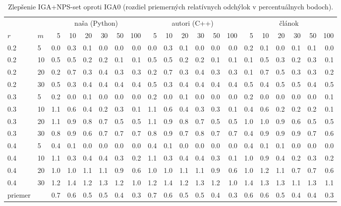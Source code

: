 \begin{table}[ht]
\centering
\scriptsize
\setlength{\tabcolsep}{3pt}
\caption{Zlepšenie IGA+NPS-set oproti IGA0 (rozdiel priemerných relatívnych odchýlok v percentuálnych bodoch).}
\label{tab:improvement_nps}
\begin{tabular}{ll|rrrrrr|rrrrrr|rrrrrr}
\toprule
 &  & \multicolumn{6}{c}{naša (Python)} & \multicolumn{6}{c}{autori (C++)} & \multicolumn{6}{c}{článok} \\
$r$ & $m$ & 5 & 10 & 20 & 30 & 50 & 100 & 5 & 10 & 20 & 30 & 50 & 100 & 5 & 10 & 20 & 30 & 50 & 100 \\
\midrule
0.2 & 5 & 0.0 & 0.3 & 0.1 & 0.0 & 0.0 & 0.0 & 0.0 & 0.3 & 0.1 & 0.0 & 0.0 & 0.0 & 0.2 & 0.1 & 0.0 & 0.1 & 0.1 & 0.0 \\
0.2 & 10 & 0.5 & 0.5 & 0.2 & 0.2 & 0.1 & 0.1 & 0.5 & 0.5 & 0.2 & 0.2 & 0.1 & 0.1 & 0.1 & 0.5 & 0.3 & 0.2 & 0.3 & 0.1 \\
0.2 & 20 & 0.2 & 0.7 & 0.3 & 0.4 & 0.3 & 0.3 & 0.2 & 0.7 & 0.3 & 0.4 & 0.3 & 0.3 & 0.1 & 0.7 & 0.5 & 0.3 & 0.3 & 0.2 \\
0.2 & 30 & 0.5 & 0.3 & 0.4 & 0.4 & 0.4 & 0.4 & 0.5 & 0.3 & 0.4 & 0.4 & 0.4 & 0.4 & 0.5 & 0.4 & 0.5 & 0.5 & 0.4 & 0.5 \\
0.3 & 5 & 0.2 & 0.0 & 0.1 & 0.0 & 0.0 & 0.0 & 0.2 & 0.0 & 0.1 & 0.0 & 0.0 & 0.0 & 0.2 & 0.0 & 0.0 & 0.0 & 0.0 & 0.1 \\
0.3 & 10 & 1.1 & 0.6 & 0.4 & 0.2 & 0.3 & 0.1 & 1.1 & 0.6 & 0.4 & 0.3 & 0.3 & 0.1 & 0.4 & 0.6 & 0.2 & 0.2 & 0.2 & 0.1 \\
0.3 & 20 & 1.1 & 0.9 & 0.8 & 0.7 & 0.5 & 0.5 & 1.1 & 0.9 & 0.8 & 0.7 & 0.5 & 0.5 & 1.0 & 1.0 & 0.9 & 0.6 & 0.5 & 0.5 \\
0.3 & 30 & 0.8 & 0.9 & 0.6 & 0.7 & 0.7 & 0.7 & 0.8 & 0.9 & 0.7 & 0.8 & 0.7 & 0.7 & 0.4 & 0.9 & 0.9 & 0.9 & 0.7 & 0.6 \\
0.4 & 5 & 0.4 & 0.1 & 0.0 & 0.0 & 0.0 & 0.0 & 0.4 & 0.1 & 0.0 & 0.0 & 0.0 & 0.0 & 0.4 & 0.1 & 0.1 & 0.0 & 0.0 & 0.0 \\
0.4 & 10 & 1.1 & 0.3 & 0.4 & 0.4 & 0.3 & 0.2 & 1.1 & 0.3 & 0.4 & 0.4 & 0.3 & 0.1 & 1.0 & 0.9 & 0.4 & 0.2 & 0.3 & 0.2 \\
0.4 & 20 & 1.0 & 1.0 & 1.1 & 1.1 & 0.9 & 0.6 & 1.0 & 1.0 & 1.1 & 1.1 & 0.9 & 0.6 & 1.0 & 1.2 & 1.1 & 0.7 & 0.7 & 0.6 \\
0.4 & 30 & 1.2 & 1.4 & 1.2 & 1.3 & 1.2 & 1.0 & 1.2 & 1.4 & 1.2 & 1.3 & 1.2 & 1.0 & 1.4 & 1.3 & 1.3 & 1.1 & 1.3 & 1.1 \\
\midrule
priemer &  & 0.7 & 0.6 & 0.5 & 0.5 & 0.4 & 0.3 & 0.7 & 0.6 & 0.5 & 0.5 & 0.4 & 0.3 & 0.6 & 0.6 & 0.5 & 0.4 & 0.4 & 0.3 \\
\bottomrule
\end{tabular}
\end{table}
